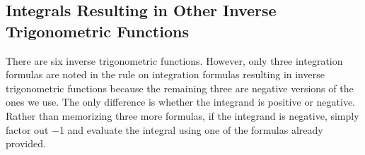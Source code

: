 \documentclass{report}
\begin{document}
    \subsection{Integrals Resulting in Other Inverse Trigonometric Functions}
    \bigbreak \noindent 
    There are six inverse trigonometric functions. However, only three integration formulas are noted in the rule on integration formulas resulting in inverse trigonometric functions because the remaining three are negative versions of the ones we use. The only difference is whether the integrand is positive or negative. Rather than memorizing three more formulas, if the integrand is negative, simply factor out −1 and evaluate the integral using one of the formulas already provided. 






    
    
\end{document}
